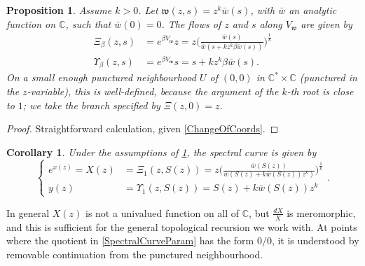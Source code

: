 \documentclass[10pt,a4paper,oneside,no-math,reqno]{amsart}%
\theoremstyle{plain}
\newtheorem{proposition}[theorem]{Proposition}
\newtheorem{corollary}[theorem]{Corollary}
\theoremstyle{definition}
\theoremstyle{remark}
\numberwithin{equation}{section}
\newcommand{\mb}[1]{\mathbb{#1}}
\newcommand{\mf}[1]{\mathfrak{#1}}
\newcommand{\1}{\mathds{1}}
\newcommand{\C}{\mb{C}}
\newcommand{\<}{\langle}
\renewcommand{\>}{\rangle}
\begin{document}
\begin{proposition}\label{Symplectomorphism}
	Assume $k>0$. Let $ \mf{w}(z,s) = z^k \bar{w}(s)$, with $ \bar{w} $ an analytic function on $ \C$, such that $ \bar{w} (0) = 0$. The flows of $ z$ and $ s$ along $ V_\mf{w}$ are given by
	\begin{align}
		\Xi_\beta (z,s)
		&= e^{\beta V_\mf{w}} z 
		=
		z \Big( \frac{\bar{w}(s)}{\bar{w}(s+ k z^k \beta \bar{w}(s))}\Big)^{\frac{1}{k}}
		\\
		\Upsilon_\beta (z,s)
		&=
		e^{\beta V_\mf{w}} s
		=
		s + k z^k \beta \bar{w} (s) .
	\end{align}
	On a small enough punctured neighbourhood $U$ of $ (0,0) $ in $ \C^* \times \C$ (punctured in the $ z$-variable), this is well-defined, because the argument of the $k$-th root is close to $ 1$; we take the branch specified by $ \Xi (z,0) = z$.\par
\end{proposition}

\begin{proof}
	Straightforward calculation, given \cref{ChangeOfCoords}.
\end{proof}


\begin{corollary}\label{SpectralCurveShape}
	Under the assumptions of \cref{Symplectomorphism}, the spectral curve is given by
	\begin{equation} \label{SpectralCurveParam}
		\begin{cases}
			e^{x(z)}
            =
            X(z)
			&=
			\Xi_1 (z, S(z))
			=
			z \Big( \frac{\bar{w}(S(z))}{\bar{w}(S(z)+ k \bar{w}(S(z))z^k)}\Big)^{\frac{1}{k}}
			\\
			y (z)
			&=
			\Upsilon_1 (z, S(z))
			=
			S(z) + k \bar{w}(S(z)) z^k
		\end{cases} .
	\end{equation}
\end{corollary}

In general $ X(z)$ is not a univalued function on all of $ \C$, but $ \frac{dX}{X}$ is meromorphic, and this is sufficient for the general topological recursion we work with. At points where the quotient in \eqref{SpectralCurveParam} has the form $0/0$, it is understood by removable continuation from the punctured neighbourhood.


\end{document}
